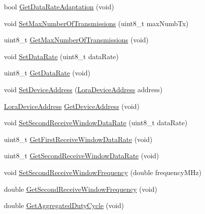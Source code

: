 \begin{DoxyCompactItemize}
\item 
bool \hyperlink{classns3_1_1lorawan_1_1EndDeviceLoraMac_aa3b3b1eff843d141de27ad73e42d1d51}{Get\+Data\+Rate\+Adaptation} (void)
\item 
void \hyperlink{classns3_1_1lorawan_1_1EndDeviceLoraMac_ad9ccf221f703b83cb1a0c0a7b07de03b}{Set\+Max\+Number\+Of\+Transmissions} (uint8\+\_\+t max\+Numb\+Tx)
\item 
uint8\+\_\+t \hyperlink{classns3_1_1lorawan_1_1EndDeviceLoraMac_a693be5d8132d489a1aa099029ad133ab}{Get\+Max\+Number\+Of\+Transmissions} (void)
\item 
void \hyperlink{classns3_1_1lorawan_1_1EndDeviceLoraMac_a4c62f5aba7104a6935e74594d064028e}{Set\+Data\+Rate} (uint8\+\_\+t data\+Rate)
\item 
uint8\+\_\+t \hyperlink{classns3_1_1lorawan_1_1EndDeviceLoraMac_a542adf7ed65bee26b4d43ed49f54a3f4}{Get\+Data\+Rate} (void)
\item 
void \hyperlink{classns3_1_1lorawan_1_1EndDeviceLoraMac_a304aa4040eefef152a13a8496a611404}{Set\+Device\+Address} (\hyperlink{classns3_1_1lorawan_1_1LoraDeviceAddress}{Lora\+Device\+Address} address)
\item 
\hyperlink{classns3_1_1lorawan_1_1LoraDeviceAddress}{Lora\+Device\+Address} \hyperlink{classns3_1_1lorawan_1_1EndDeviceLoraMac_a27064ed2de9f1a8eebc0f57e042f24a1}{Get\+Device\+Address} (void)
\item 
void \hyperlink{classns3_1_1lorawan_1_1EndDeviceLoraMac_a1665b5bad99ef1ee5ca726e8efb6736d}{Set\+Second\+Receive\+Window\+Data\+Rate} (uint8\+\_\+t data\+Rate)
\item 
uint8\+\_\+t \hyperlink{classns3_1_1lorawan_1_1EndDeviceLoraMac_a7156019e4178af699bd4cc328b598995}{Get\+First\+Receive\+Window\+Data\+Rate} (void)
\item 
uint8\+\_\+t \hyperlink{classns3_1_1lorawan_1_1EndDeviceLoraMac_aa4b004ed8d0a79905ad95687a93e4c4f}{Get\+Second\+Receive\+Window\+Data\+Rate} (void)
\item 
void \hyperlink{classns3_1_1lorawan_1_1EndDeviceLoraMac_a366ff7099a3ae9afb64c9ca6be521c55}{Set\+Second\+Receive\+Window\+Frequency} (double frequency\+M\+Hz)
\item 
double \hyperlink{classns3_1_1lorawan_1_1EndDeviceLoraMac_af5ba5257abb97817dc4f5266d7611833}{Get\+Second\+Receive\+Window\+Frequency} (void)
\item 
double \hyperlink{classns3_1_1lorawan_1_1EndDeviceLoraMac_ae974b8539199bbc493ba5436d1689860}{Get\+Aggregated\+Duty\+Cycle} (void)
\item 

\end{DoxyCompactItemize}
